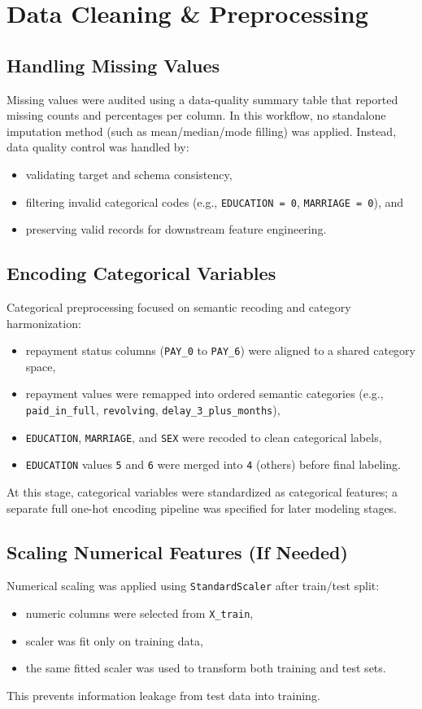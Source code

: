 \section{Data Cleaning \& Preprocessing}

\subsection{Handling Missing Values}
Missing values were audited using a data-quality summary table that reported missing counts and percentages per column. In this workflow, no standalone imputation method (such as mean/median/mode filling) was applied. Instead, data quality control was handled by:
\begin{itemize}
	\item validating target and schema consistency,
	\item filtering invalid categorical codes (e.g., \texttt{EDUCATION = 0}, \texttt{MARRIAGE = 0}), and
	\item preserving valid records for downstream feature engineering.
\end{itemize}

\subsection{Encoding Categorical Variables}
Categorical preprocessing focused on semantic recoding and category harmonization:
\begin{itemize}
	\item repayment status columns (\texttt{PAY\_0} to \texttt{PAY\_6}) were aligned to a shared category space,
	\item repayment values were remapped into ordered semantic categories (e.g., \texttt{paid\_in\_full}, \texttt{revolving}, \texttt{delay\_3\_plus\_months}),
	\item \texttt{EDUCATION}, \texttt{MARRIAGE}, and \texttt{SEX} were recoded to clean categorical labels,
	\item \texttt{EDUCATION} values \texttt{5} and \texttt{6} were merged into \texttt{4} (others) before final labeling.
\end{itemize}
At this stage, categorical variables were standardized as categorical features; a separate full one-hot encoding pipeline was specified for later modeling stages.

\subsection{Scaling Numerical Features (If Needed)}
Numerical scaling was applied using \texttt{StandardScaler} after train/test split:
\begin{itemize}
	\item numeric columns were selected from \texttt{X\_train},
	\item scaler was fit only on training data,
	\item the same fitted scaler was used to transform both training and test sets.
\end{itemize}
This prevents information leakage from test data into training.

